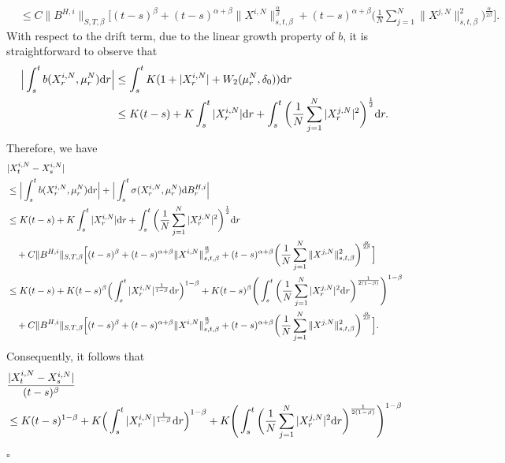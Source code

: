 \documentclass[12pt]{article}
\def\d{\text{\rm{d}}}
\newenvironment{proof}{{\noindent\it Proof.}\ }{\hfill $\square$\par}
\numberwithin{equation}{section}
\begin{document}
\begin{proof}
\begin{align*}
			&\leq C\|B^{H,i}\|_{S,T,\beta}\Big[ (t-s)^{\beta}+(t-s)^{\alpha+\beta}\|X^{i,N}\|_{s,t,\beta}^{\frac{\alpha}{\beta}}+(t-s)^{\alpha+\beta}\bigg(\frac{1}{N}\sum_{j=1}^N\|X^{j,N}\|^2_{s,t,\beta}\bigg)^{\frac{\alpha}{2\beta}}  \Big].
		\end{align*}
		With respect to the drift term, due to the linear growth property of
		$b$, it is straightforward to observe that
		\begin{equation}
			\begin{aligned}
				\Big| \int_{s}^{t}b(X^{i,N}_r,\mu_r^N)\d r\Big|&\leq \int_{s}^{t} K(1+|X^{i,N}_r|+W_2(\mu_r^N,\delta_0))\d r\\
				&\leq K(t-s)+K\int_{s}^{t}|X^{i,N}_r|\d r+\int_{s}^{t}\bigg(\frac{1}{N}\sum_{j=1}^N|X^{j,N}_r|^2\bigg)^{\frac{1}{2}}\d r.
			\end{aligned}
		\end{equation}
		Therefore, we have
		\begin{equation}
			\begin{aligned}
				&|X^{i,N}_t-X^{i,N}_s|\\
				&\leq \Big| \int_{s}^{t}b(X^{i,N}_r,\mu_r^N)\d r\Big|+\Big|\int_{s}^{t}\sigma(X_r^{i,N},\mu_r^N)\d B^{H,i}_r\Big|\\
				&\leq K(t-s)+K\int_{s}^{t}|X^{i,N}_r|\d r+\int_{s}^{t}\bigg(\frac{1}{N}\sum_{j=1}^N|X^{j,N}_r|^2\bigg)^{\frac{1}{2}}\d r\\
				&\quad+C\|B^{H,i}\|_{S,T,\beta}\Big[ (t-s)^{\beta}+(t-s)^{\alpha+\beta}\|X^{i,N}\|_{s,t,\beta}^{\frac{\alpha}{\beta}}+(t-s)^{\alpha+\beta}\bigg(\frac{1}{N}\sum_{j=1}^N\|X^{j,N}\|^2_{s,t,\beta}\bigg)^{\frac{\alpha}{2\beta}}  \Big]\\
				&\leq K(t-s)+K(t-s)^{\beta}\Big(\int_{s}^{t}|X^{i,N}_r|^{\frac{1}{1-\beta}}\d r\Big)^{1-\beta}+K(t-s)^{\beta}\Bigg(\int_{s}^{t}\bigg(\frac{1}{N}\sum_{j=1}^N|X^{j,N}_r|^2\d r\bigg)^{\frac{1}{2(1-\beta)}}\Bigg)^{1-\beta}\\
				&\quad+C\|B^{H,i}\|_{S,T,\beta}\Big[ (t-s)^{\beta}+(t-s)^{\alpha+\beta}\|X^{i,N}\|_{s,t,\beta}^{\frac{\alpha}{\beta}}+(t-s)^{\alpha+\beta}\bigg(\frac{1}{N}\sum_{j=1}^N\|X^{j,N}\|^2_{s,t,\beta}\bigg)^{\frac{\alpha}{2\beta}}  \Big].
			\end{aligned}
		\end{equation}
		Consequently, it follows that
		\begin{equation}
			\begin{aligned}
				&\frac{|X^{i,N}_t-X^{i,N}_s|}{(t-s)^\beta}\\
				&\leq K(t-s)^{1-\beta}+K\Big(\int_{s}^{t}|X^{i,N}_r|^{\frac{1}{1-\beta}}\d r\Big)^{1-\beta}+K\Bigg(\int_{s}^{t}\bigg(\frac{1}{N}\sum_{j=1}^N|X^{j,N}_r|^2\d r\bigg)^{\frac{1}{2(1-\beta)}}\Bigg)^{1-\beta}\\

\end{aligned}
\end{equation}
\end{proof}
\end{document}
